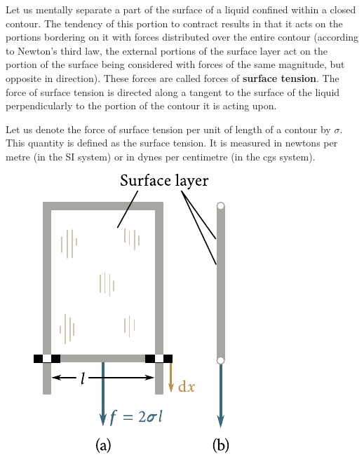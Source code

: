 Let us mentally separate a part of the surface of a liquid confined within a closed contour. The tendency of this portion to contract results in that it acts on the portions bordering on it with forces distributed over the entire contour (according to Newton's third law, the external portions of the surface layer act on the portion of the surface being considered with forces of the same magnitude, but opposite in direction). These forces are called forces of \textbf{surface tension}. The force of surface tension is directed along a tangent to the surface of the liquid perpendicularly to the portion of the contour it is acting upon.

Let us denote the force of surface tension per unit of length of a contour by $\sigma$. This quantity is defined as the surface tension. It is measured in newtons per metre (in the SI system) or in dynes per centimetre (in the cgs system).

\begin{figure}[t]
	\begin{center}
		\includegraphics[scale=1.1]{figures/ch_14/fig_14_2.pdf}
		\caption[]{}
		\label{fig:14_2}
	\end{center}
	\vspace{-0.8cm}
\end{figure}

